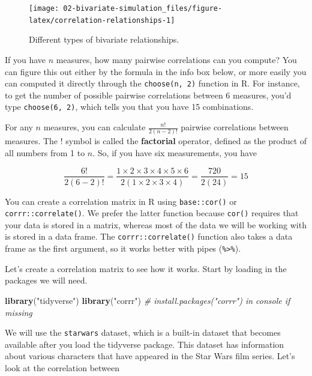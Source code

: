 \documentclass[]{book}
\newenvironment{Shaded}{\begin{snugshade}}{\end{snugshade}}
\newcommand{\CommentTok}[1]{\textcolor[rgb]{0.56,0.35,0.01}{\textit{#1}}}
\newcommand{\KeywordTok}[1]{\textcolor[rgb]{0.13,0.29,0.53}{\textbf{#1}}}
\newcommand{\NormalTok}[1]{#1}
\newcommand{\StringTok}[1]{\textcolor[rgb]{0.31,0.60,0.02}{#1}}
\begin{document}
\begin{figure}

{\centering \texttt{[image: 02-bivariate-simulation\_files/figure-latex/correlation-relationships-1]} 

}

\caption{Different types of bivariate relationships.}\label{fig:correlation-relationships}
\end{figure}

If you have \(n\) measures, how many pairwise correlations can you compute? You can figure this out either by the formula in the info box below, or more easily you can computed it directly through the \texttt{choose(n,\ 2)} function in R. For instance, to get the number of possible pairwise correlations between 6 measures, you'd type \texttt{choose(6,\ 2)}, which tells you that you have 15 combinations.

\begin{info}
For any \(n\) measures, you can calculate \(\frac{n!}{2(n - 2)!}\)
pairwise correlations between measures. The \(!\) symbol is called the
\textbf{factorial} operator, defined as the product of all numbers from
1 to \(n\). So, if you have six measurements, you have

\[
\frac{6!}{2(6-2)!} = \frac{1 \times 2 \times 3 \times 4 \times 5 \times 6}{2\left(1 \times 2 \times 3 \times 4\right)} = \frac{720}{2(24)} = 15
\]
\end{info}

You can create a correlation matrix in R using \texttt{base::cor()} or \texttt{corrr::correlate()}. We prefer the latter function because \texttt{cor()} requires that your data is stored in a matrix, whereas most of the data we will be working with is stored in a data frame. The \texttt{corrr::correlate()} function also takes a data frame as the first argument, so it works better with pipes (\texttt{\%\textgreater{}\%}).

Let's create a correlation matrix to see how it works. Start by loading in the packages we will need.

\begin{Shaded}
\begin{Highlighting}[]
\KeywordTok{library}\NormalTok{(}\StringTok{"tidyverse"}\NormalTok{)}
\KeywordTok{library}\NormalTok{(}\StringTok{"corrr"}\NormalTok{)  }\CommentTok{# install.packages("corrr") in console if missing}
\end{Highlighting}
\end{Shaded}

We will use the \texttt{starwars} dataset, which is a built-in dataset that becomes available after you load the tidyverse package. This dataset has information about various characters that have appeared in the Star Wars film series. Let's look at the correlation between
\end{document}
